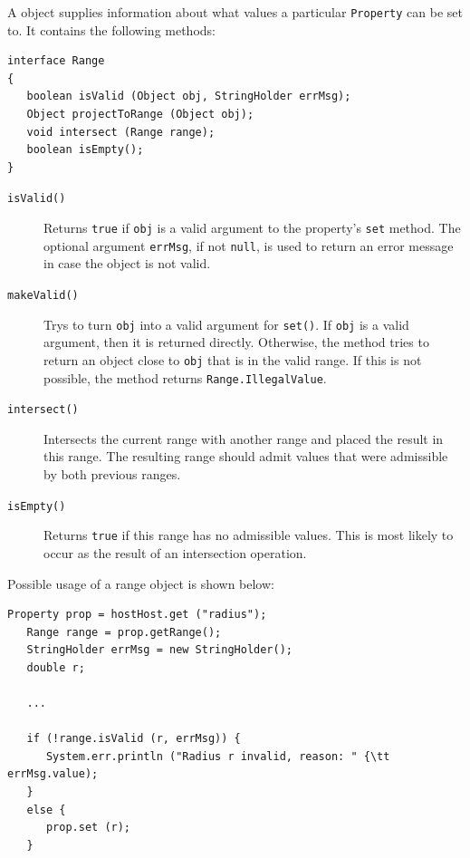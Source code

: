 \documentclass{article}
\begin{document}
A  object supplies information about what values a
particular {\tt Property} can be set to. It contains the following
methods:

\begin{lstlisting}[]
interface Range
{
   boolean isValid (Object obj, StringHolder errMsg);
   Object projectToRange (Object obj);
   void intersect (Range range);
   boolean isEmpty();
}
\end{lstlisting}

\begin{description}

\item[{\tt isValid()} ] \mbox{}

Returns {\tt true} if {\tt obj} is a valid
argument to the property's {\tt set} method. The optional
argument {\tt errMsg}, if not {\tt null}, is used to return
an error message in case the object is not valid.

\item[{\tt makeValid()} ] \mbox{}

Trys to turn {\tt obj} into a valid argument for {\tt set()}. If
{\tt obj} is a valid argument, then it is returned directly. Otherwise,
the method tries to return an object close to {\tt obj} that is in the
valid range. If this is not possible, the method returns
{\tt Range.IllegalValue}.

\item[{\tt intersect()} ] \mbox{}

Intersects the current range with another range and
placed the result in this range. The resulting range should admit values
that were admissible by both previous ranges.

\item[{\tt isEmpty()} ] \mbox{}

Returns {\tt true} if this range has no admissible values.
This is most likely to occur as the result of an intersection
operation.

\end{description}

Possible usage of a range object is shown below:

\begin{lstlisting}[]
   Property prop = hostHost.get ("radius");
   Range range = prop.getRange();
   StringHolder errMsg = new StringHolder();
   double r;

   ...

   if (!range.isValid (r, errMsg)) {
      System.err.println ("Radius r invalid, reason: " {\tt  errMsg.value);
   }
   else {
      prop.set (r);
   }
\end{lstlisting}
\end{document}
